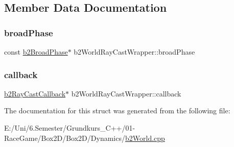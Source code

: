 \subsection{Member Data Documentation}
\mbox{\label{structb2_world_ray_cast_wrapper_a8bf380db0756a568bec076e549544145}} 
\subsubsection{\texorpdfstring{broadPhase}{broadPhase}}
{\footnotesize\ttfamily const \mbox{\hyperlink{classb2_broad_phase}{b2\+Broad\+Phase}}$\ast$ b2\+World\+Ray\+Cast\+Wrapper\+::broad\+Phase}

\mbox{\label{structb2_world_ray_cast_wrapper_a5e6d85af5ae2cda7a8da2306d6b86a3e}} 
\subsubsection{\texorpdfstring{callback}{callback}}
{\footnotesize\ttfamily \mbox{\hyperlink{classb2_ray_cast_callback}{b2\+Ray\+Cast\+Callback}}$\ast$ b2\+World\+Ray\+Cast\+Wrapper\+::callback}



The documentation for this struct was generated from the following file\+:\begin{DoxyCompactItemize}
\item 
E\+:/\+Uni/6.\+Semester/\+Grundkurs\+\_\+\+C++/01-\/\+Race\+Game/\+Box2\+D/\+Box2\+D/\+Dynamics/\mbox{\hyperlink{b2_world_8cpp}{b2\+World.\+cpp}}\end{DoxyCompactItemize}

